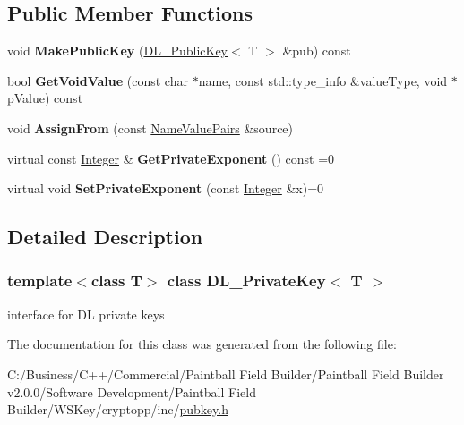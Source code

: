 \subsection*{Public Member Functions}
\begin{DoxyCompactItemize}
\item 
\hypertarget{class_d_l___private_key_a6ae6210919b251d722571cebf26938d6}{
void {\bfseries MakePublicKey} (\hyperlink{class_d_l___public_key}{DL\_\-PublicKey}$<$ T $>$ \&pub) const }
\label{class_d_l___private_key_a6ae6210919b251d722571cebf26938d6}

\item 
\hypertarget{class_d_l___private_key_a2471b7831c99ad60094652ef7098b43c}{
bool {\bfseries GetVoidValue} (const char $\ast$name, const std::type\_\-info \&valueType, void $\ast$pValue) const }
\label{class_d_l___private_key_a2471b7831c99ad60094652ef7098b43c}

\item 
\hypertarget{class_d_l___private_key_af7d9355890a52c1f71c86e490da37ac5}{
void {\bfseries AssignFrom} (const \hyperlink{class_name_value_pairs}{NameValuePairs} \&source)}
\label{class_d_l___private_key_af7d9355890a52c1f71c86e490da37ac5}

\item 
\hypertarget{class_d_l___private_key_ac2c0ba40eeb8b935135648b967b3ddd3}{
virtual const \hyperlink{class_integer}{Integer} \& {\bfseries GetPrivateExponent} () const =0}
\label{class_d_l___private_key_ac2c0ba40eeb8b935135648b967b3ddd3}

\item 
\hypertarget{class_d_l___private_key_aade66a183c41178bc4fbaa3492987862}{
virtual void {\bfseries SetPrivateExponent} (const \hyperlink{class_integer}{Integer} \&x)=0}
\label{class_d_l___private_key_aade66a183c41178bc4fbaa3492987862}

\end{DoxyCompactItemize}


\subsection{Detailed Description}
\subsubsection*{template$<$class T$>$ class DL\_\-PrivateKey$<$ T $>$}

interface for DL private keys 

The documentation for this class was generated from the following file:\begin{DoxyCompactItemize}
\item 
C:/Business/C++/Commercial/Paintball Field Builder/Paintball Field Builder v2.0.0/Software Development/Paintball Field Builder/WSKey/cryptopp/inc/\hyperlink{pubkey_8h}{pubkey.h}\end{DoxyCompactItemize}
